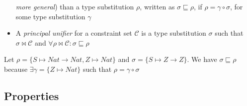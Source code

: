 \documentclass[8pt]{beamer}
\begin{document}
\begin{frame}
\begin{itemize}
                \emph{more general}) than a type substitution $\rho$, written
                as $\sigma \sqsubseteq \rho$, if $\rho = \gamma \circ \sigma$,
                for some type substitution $\gamma$
        \item   A \emph{principal unifier} for a constraint set $\mathcal{C}$ 
                is a type substitution $\sigma$ such that $\sigma \Join \mathcal{C}$
                and $\forall \rho \Join \mathcal{C}: \sigma \sqsubseteq \rho$
    \end{itemize}
    \begin{example}
        Let $\rho = \{S \mapsto Nat \rightarrow Nat, Z \mapsto Nat\}$ 
        and $\sigma = \{S \mapsto Z \rightarrow Z\}$. We have $\sigma 
        \sqsubseteq \rho$ because $\exists \gamma = \{Z \mapsto Nat\}$ 
        such that $\rho = \gamma \circ \sigma$
    \end{example}
\end{frame}

\subsection{Properties}
\end{document}
